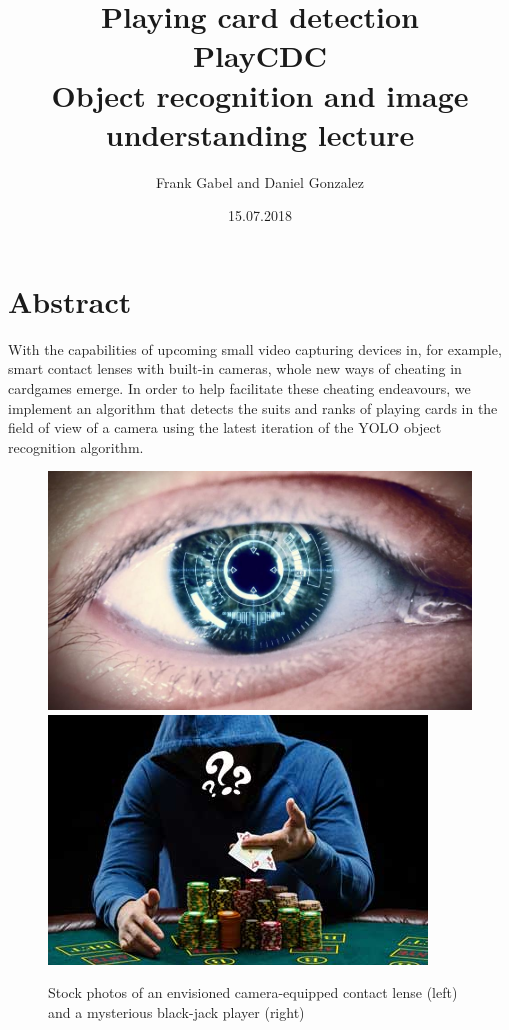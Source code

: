 \documentclass[a4paper]{article}
\title{\textbf{Playing card detection}\\ PlayCDC\\Object recognition and image understanding lecture}
\author{Frank Gabel and Daniel Gonzalez}
\date{15.07.2018}
\begin{document}
\maketitle
\section{Abstract}
With the capabilities of upcoming small video capturing devices in, for example, smart contact lenses with built-in cameras, whole new ways of cheating in cardgames emerge. In order to help facilitate these cheating endeavours, we implement an algorithm that detects the suits and ranks of playing cards in the field of view of a camera using the latest iteration of the YOLO object recognition algorithm.
\begin{figure}[h]
\includegraphics[scale=0.25]{images/contact_lense}
\includegraphics[scale=0.532]{images/poker_player}
\caption{Stock photos of an envisioned camera-equipped contact lense (left) and a mysterious black-jack player (right)}
\end{figure}
\end{document}
